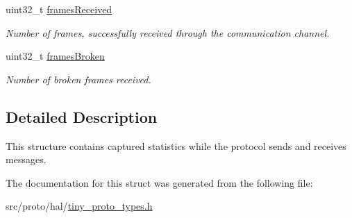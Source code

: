 \begin{DoxyCompactItemize}
\mbox{\label{structSTinyStats_a19dfd3a62dbb9d86f6fb77eb1ea6f871}} 
uint32\+\_\+t \hyperlink{structSTinyStats_a19dfd3a62dbb9d86f6fb77eb1ea6f871}{frames\+Received}
\begin{DoxyCompactList}\small\item\em Number of frames, successfully received through the communication channel. \end{DoxyCompactList}\item 
\mbox{\label{structSTinyStats_abe4f4a9455b532e22f29e60789386130}} 
uint32\+\_\+t \hyperlink{structSTinyStats_abe4f4a9455b532e22f29e60789386130}{frames\+Broken}
\begin{DoxyCompactList}\small\item\em Number of broken frames received. \end{DoxyCompactList}\end{DoxyCompactItemize}


\subsection{Detailed Description}
This structure contains captured statistics while the protocol sends and receives messages. 

The documentation for this struct was generated from the following file\+:\begin{DoxyCompactItemize}
\item 
src/proto/hal/\hyperlink{tiny__proto__types_8h}{tiny\+\_\+proto\+\_\+types.\+h}\end{DoxyCompactItemize}
